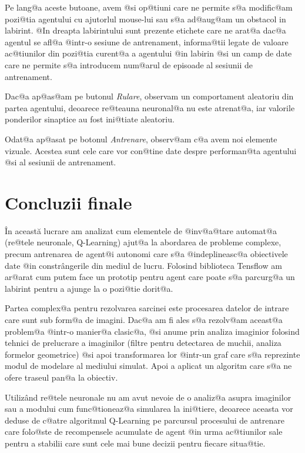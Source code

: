 Pe lang@a aceste butoane, avem @si op@tiuni care ne permite s@a modific@am pozi@tia agentului cu ajutorlul mouse-lui sau s@a ad@aug@am un obstacol in labirint. @In dreapta labirintului sunt prezente etichete care ne arat@a dac@a agentul se afl@a @intr-o sesiune de antrenament, informa@tii legate de valoare ac@tiunilor din pozi@tia curent@a a agentului @in labirin @si un camp de date care ne permite s@a introducem num@arul de episoade al sesiunii de antrenament.

Dac@a ap@as@am pe butonul \textsl{Rulare}, observam un comportament aleatoriu din partea agentului, deoarece re@teauna neuronal@a nu este atrenat@a, iar valorile ponderilor sinaptice au fost ini@tiate aleatoriu.

Odat@a ap@asat pe botonul \textsl{Antrenare}, observ@am c@a avem noi elemente vizuale. Acestea sunt cele care vor con@tine date despre performan@ta agentului @si al sesiunii de antrenament.  


\chapter*{Concluzii finale}



\^ In aceast\u a lucrare am analizat cum elementele de @inv@a@tare automat@a (re@tele neuronale, Q-Learning) ajut@a la abordarea de probleme complexe, precum antrenarea de agent@i autonomi care s@a @indeplineasc@a obiectivele date @in constr\^ angerile din mediul de lucru. Folosind biblioteca Tensflow am ar@arat cum putem face un prototip pentru agent care poate s@a parcurg@a un labirint pentru a ajunge la o pozi@tie dorit@a. 

Partea complex@a pentru rezolvarea sarcinei este procesarea datelor de intrare care sunt sub form@a de imagini. Dac@a am fi ales s@a rezolv@am aceast@a problem@a @intr-o manier@a clasic@a, @si anume prin analiza imaginior folosind tehnici de prelucrare a imaginilor (filtre pentru detectarea de muchii, analiza formelor geometrice) @si apoi transformarea lor @intr-un graf care s@a reprezinte modul de modelare al mediului simulat. Apoi a aplicat un algoritm care s@a ne ofere traseul pan@a la obiectiv.

Utiliz\^ and re@tele neuronale nu am avut nevoie de o analiz@a asupra imaginilor sau a modului cum func@tioneaz@a simularea la ini@tiere, deoarece aceasta vor deduse de c@atre algoritmul Q-Learning pe parcursul procesului de antrenare care folo@ste de recompensele acumulate de agent @in urma ac@tiunilor sale pentru a stabilii care sunt cele mai bune decizii pentru fiecare situa@tie.

